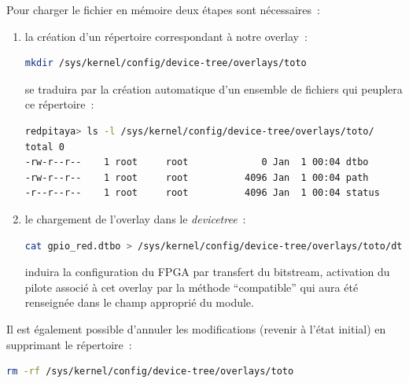 \documentclass[12pt,oneside]{article}
\begin{document}
Pour charger le fichier en m\'emoire deux \'etapes sont n\'ecessaires~:
\begin{enumerate}
\item
la cr\'eation d'un r\'epertoire correspondant \`a notre overlay~:
\begin{lstlisting}[language=bash]
mkdir /sys/kernel/config/device-tree/overlays/toto
\end{lstlisting}
se traduira par la cr\'eation automatique d'un ensemble de
fichiers qui peuplera ce r\'epertoire~:
\begin{lstlisting}[language=bash]
redpitaya> ls -l /sys/kernel/config/device-tree/overlays/toto/
total 0
-rw-r--r--    1 root     root             0 Jan  1 00:04 dtbo
-rw-r--r--    1 root     root          4096 Jan  1 00:04 path
-r--r--r--    1 root     root          4096 Jan  1 00:04 status
\end{lstlisting}
\item
le chargement de l'overlay dans le {\em devicetree}~:
\begin{lstlisting}[language=bash]
cat gpio_red.dtbo > /sys/kernel/config/device-tree/overlays/toto/dtbo
\end{lstlisting}
induira la configuration du FPGA par transfert du bitstream, activation du pilote associ\'e
\`a cet overlay par la m\'ethode ``compatible'' qui aura \'et\'e renseign\'ee dans le champ appropri\'e
du module.
\end{enumerate}
 
Il est \'egalement possible d'annuler les modifications (revenir \`a l'\'etat
initial) en supprimant le r\'epertoire~:
\begin{lstlisting}[language=bash]
rm -rf /sys/kernel/config/device-tree/overlays/toto
\end{lstlisting}
\end{document}
